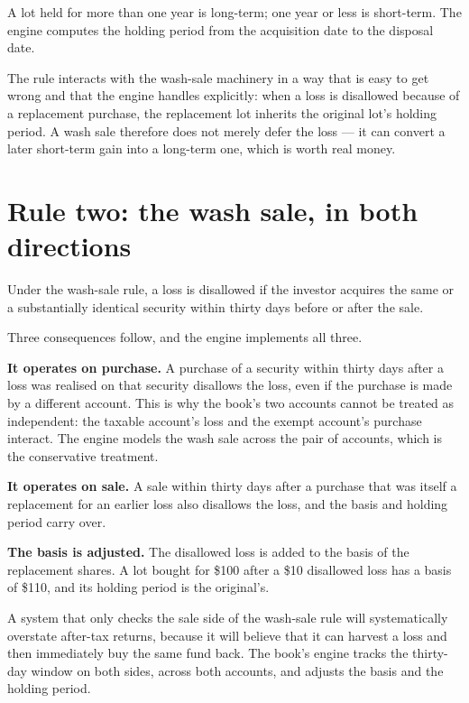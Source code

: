 A lot held for more than one year is long-term; one year or less is
short-term. The engine computes the holding period from the acquisition
date to the disposal date.

The rule interacts with the wash-sale machinery in a way that is easy to
get wrong and that the engine handles explicitly: when a loss is
disallowed because of a replacement purchase, the replacement lot
inherits the original lot's holding period. A wash sale therefore does
not merely defer the loss --- it can convert a later short-term gain into
a long-term one, which is worth real money.

\section{Rule two: the wash sale, in both directions}

Under the wash-sale rule, a loss is disallowed if the investor acquires
the same or a substantially identical security within thirty days before
or after the sale.

Three consequences follow, and the engine implements all three.

\textbf{It operates on purchase.} A purchase of a security within thirty
days after a loss was realised on that security disallows the loss, even
if the purchase is made by a different account. This is why the book's
two accounts cannot be treated as independent: the taxable account's loss
and the exempt account's purchase interact. The engine models the wash
sale across the pair of accounts, which is the conservative treatment.

\textbf{It operates on sale.} A sale within thirty days after a purchase
that was itself a replacement for an earlier loss also disallows the
loss, and the basis and holding period carry over.

\textbf{The basis is adjusted.} The disallowed loss is added to the basis
of the replacement shares. A lot bought for \$100 after a \$10 disallowed
loss has a basis of \$110, and its holding period is the original's.

\begin{takeaway}
A system that only checks the sale side of the wash-sale rule will
systematically overstate after-tax returns, because it will believe that
it can harvest a loss and then immediately buy the same fund back. The
book's engine tracks the thirty-day window on both sides, across both
accounts, and adjusts the basis and the holding period.
\end{takeaway}

